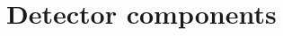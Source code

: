 \ifdefined\isfinal\documentclass[final]{pd-tdr}\else\documentclass{pd-tdr}\fi
\begin{document}
%
%
%
%
%

%

\chapter{Detector components}


%

%

%

%

%








% 

\cleardoublepage


\end{document}
